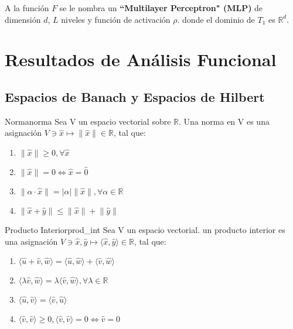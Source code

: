 \documentclass[12pt,a4paper]{book}
\providecommand{\abs}[1]{\lvert#1\rvert}
\providecommand{\norm}[1]{\lVert#1\rVert}
\providecommand{\inp}[1]{\langle#1\rangle}
\begin{document}
A la función $F$ se le nombra un \textbf{``Multilayer Perceptron" (MLP)} de dimensión $d$, $L$ niveles y función de activación $\rho$. donde el dominio de $T_{1}$ es $\mathbb{R}^{d}$.
\chapter{Resultados de Análisis Funcional}

\section{Espacios de Banach y Espacios de Hilbert}

\begin{definicion}{Norma}{norma}
Sea V un espacio vectorial sobre $\mathbb{R}$. Una norma en V es una asignación $V\ni \widehat{x}\mapsto \lVert \widehat x \rVert \in \mathbb{R}$, tal que:
\begin{enumerate}
\item $\norm{\widehat{x}}\geq 0, \forall \widehat{x}$
\item $\norm{\widehat{x}}=0\Leftrightarrow \widehat{x}=\widehat{0}$
\item $\norm{\alpha\cdot\widehat{x}}=\abs{\alpha}\norm{\widehat{x}}, \forall\alpha\in\mathbb{R}$
\item $\norm{\widehat{x}+\widehat{y}}\leq\norm{\widehat{x}}+\norm{\widehat{y}}$ 
\end{enumerate}
\end{definicion}

\smallskip

\begin{definicion}{Producto Interior}{prod_int}
Sea V un espacio vectorial. un producto interior es una asignación $V\ni\widehat{x},\widehat{y}\mapsto \inp{\widehat{x},\widehat{y}} \in \mathbb{R}$, tal que:
\begin{enumerate}
\item $\inp{\widehat{u}+\widehat{v},\widehat{w}}=\inp{\widehat{u},\widehat{w}}+\inp{\widehat{v},\widehat{w}}$
\item $\inp{\lambda\widehat{v},\widehat{w}}=\lambda\inp{\widehat{v},\widehat{w}}, \forall\lambda\in\mathbb{R}$
\item $\inp{\widehat{u},\widehat{v}}=\inp{\widehat{v},\widehat{u}}$
\item $\inp{\widehat{v},\widehat{v}}\geq 0, \inp{\widehat{v},\widehat{v}}=0 \Leftrightarrow \widehat{v}=0$
\end{enumerate}
\end{definicion}
\end{document}
